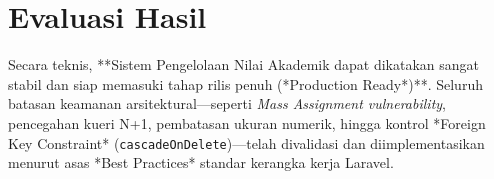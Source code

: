 \documentclass[12pt, a4paper]{article}
\begin{document}
\section{Evaluasi Hasil}
Secara teknis, **Sistem Pengelolaan Nilai Akademik dapat dikatakan sangat stabil dan siap memasuki tahap rilis penuh (*Production Ready*)**. Seluruh batasan keamanan arsitektural—seperti \textit{Mass Assignment vulnerability}, pencegahan kueri N+1, pembatasan ukuran numerik, hingga kontrol *Foreign Key Constraint* (\texttt{cascadeOnDelete})—telah divalidasi dan diimplementasikan menurut asas *Best Practices* standar kerangka kerja Laravel.
\end{document}
